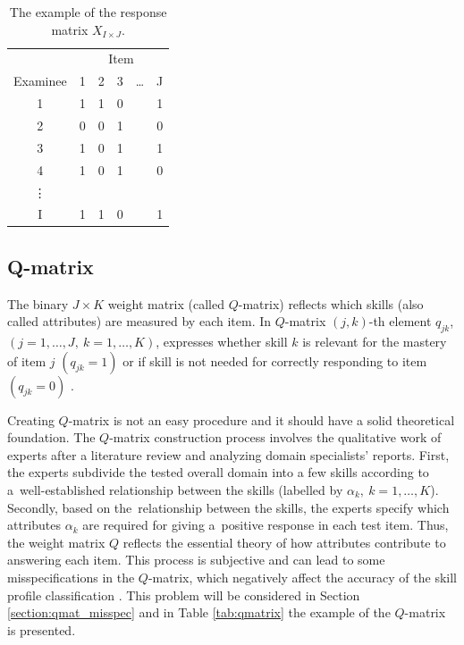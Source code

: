 \documentclass[english]{pwr_wmat_praca_dyplomowa}
\theoremstyle{plain}
\theoremstyle{definition}
\numberwithin{theorem}{chapter}
\begin{document}
\begin{table}[H]
	\centering
	\begin{tabular}{c c c c c c} 
		\hline
		{\rule{0pt}{3ex}} & \multicolumn{5}{c}{Item} \\
		Examinee & 1 & 2 & 3 & \ldots & J \\ [0.5ex] 
		\hline
		1 & 1 & 1 & 0 & & 1 \\ 
		2 & 0 & 0 & 1 & & 0 \\
		3 & 1 & 0 & 1 & & 1 \\
		4 & 1 & 0 & 1 & & 0 \\
		\vdots & & & & & \\
		I & 1 & 1 & 0 & & 1\\ [1ex] 
		\hline
	\end{tabular}
	\caption{The example of the response matrix $X_{I \times J}$.}
	\label{tab:responsemat} 
\end{table}

\subsection{Q-matrix}

The binary $J \times K$ weight matrix (called $Q$-matrix) reflects which skills (also called attributes) are measured by each item. In $Q$-matrix $(j,k)$-th element $q_{jk}$, $(j=1,\ldots,J, \: k=1,\ldots,K)$, expresses whether skill $k$ is relevant for the mastery of item $j$ $(q_{jk} = 1)$ or if skill is not needed for correctly responding to item $(q_{jk} = 0)$ \cite{cdm_in_r}. 

Creating $Q$-matrix is not an easy procedure and it should have a solid theoretical foundation. The $Q$-matrix construction process involves the qualitative work of experts after a literature review and analyzing domain specialists' reports. First, the experts subdivide the tested overall domain into a few skills according to a~well-established relationship between the skills (labelled by $\alpha_k, \: k = 1,\ldots,K$). Secondly, based on the~relationship between the skills, the experts specify which attributes $\alpha_k$ are required for giving a~positive response in each test item. Thus, the weight matrix $Q$ reflects the essential theory of how attributes contribute to answering each item. This process is subjective and can lead to some misspecifications in the $Q$-matrix, which negatively affect the accuracy of the skill profile classification \cite{de_la_torre_2016}. This problem will be considered in Section \ref{section:qmat_misspec} and in Table \ref{tab:qmatrix} the example of the $Q$-matrix is presented.
\end{document}
